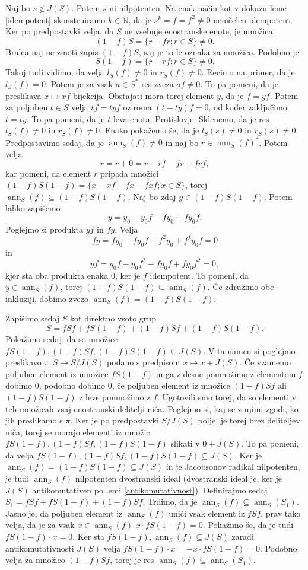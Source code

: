 \documentclass[a4paper, 12pt]{amsart}
\theoremstyle{definition} %
\theoremstyle{plain} %
\newcommand{\N}{\mathbb N}
\DeclareMathOperator{\ann}{ann}
\begin{document}
Naj bo $s\notin J(S)$. Potem $s$ ni nilpotenten. Na enak način kot v dokazu leme \ref{idempotent} skonstruiramo $k\in \N$, da je $s^k = f = f^2\neq 0$ neničelen idempotent. Ker po predpostavki velja, da $S$ ne vsebuje enostranske enote, je množica
$$
(1-f)S = \{r-fr; r\in S\}\neq 0.
$$
Bralca naj ne zmoti zapis $(1-f)S$, saj je to le oznaka za množico. Podobno je 
$$
S(1-f) = \{r-rf;r\in S\} \neq 0.
$$
Takoj tudi vidimo, da velja $l_S(f) \neq 0$ in $r_S(f) \neq 0$. Recimo na primer, da je $l_S(f)=0$. Potem je za vsak $a\in S^*$ res zveza $af \neq 0$. To pa pomeni, da je preslikava $x\mapsto xf$ bijekcija. Obstajati mora torej element $y$, da je $f=yf$. Potem za poljuben $t\in S$ velja $tf = tyf$ oziroma $(t-ty)f=0 $, od koder zaključimo $t = ty$. To pa pomeni, da je $t$ leva enota. Protislovje. Sklenemo, da je res $l_S(f) \neq 0$ in $r_S(f) \neq 0$. Enako pokažemo še, da je $l_S(s) \neq 0$ in $r_S(s) \neq 0$. Predpostavimo sedaj, da je $\ann_S(f) \neq 0$ in naj bo $r\in \ann_S(f)^*$. Potem velja
$$
r = r + 0 = r - rf - fr + frf, 
$$
kar pomeni, da element $r$ pripada množici $(1-f)S(1-f) = \{x-xf-fx+fxf; x\in S\}$, torej $\ann_S(f) \subseteq (1-f)S(1-f)$. Naj bo zdaj $y\in (1-f)S(1-f)$. Potem lahko zapišemo 
$$
y = y_0 - y_0 f -f y_0 + fy_0 f.
$$
Poglejmo si produkta $yf$ in $fy$. Velja 
$$
fy = fy_0 - fy_0 f - f^2 y_0 + f^f y_0 f = 0
$$
in
$$
yf = y_0 f - y_0 f^2 - fy_0 f + fy_0 f^2=0,
$$
kjer sta oba produkta enaka 0, ker je $f$ idempotent. To pomeni, da $y\in \ann_S(f)$, torej $(1-f)S(1-f) \subseteq \ann_S(f)$. Če združimo obe inkluziji, dobimo zvezo $\ann_S(f) = (1-f)S(1-f)$.

Zapišimo sedaj $S$ kot direktno vsoto grup
$$
S = fSf + fS(1-f) + (1-f)Sf + (1-f)S(1-f).
$$
Pokažimo sedaj, da so množice  $fS(1-f), (1-f)Sf, (1-f)S(1-f) \subseteq J(S)$. V ta namen si poglejmo preslikavo $\pi : S \rightarrow S/J(S)$ podano s predpisom $x\mapsto x+J(S)$. Če vzamemo poljuben element iz množice $fS(1-f)$ in ga z desne pomnožimo z elementom $f$ dobimo 0, podobno dobimo 0, če poljuben element iz množice $(1-f)Sf$ ali $(1-f)S(1-f)$ z leve pomnožimo z $f$. Ugotovili smo torej, da so elementi v teh množicah vsaj enostranski delitelji niča. Poglejmo si, kaj se z njimi zgodi, ko jih preslikamo s $\pi$. Ker je po predpostavki $S/J(S)$ polje, je torej brez deliteljev niča, torej se morajo elementi iz množic $fS(1-f), (1-f)Sf, (1-f)S(1-f)$ slikati v $0+J(S)$. To pa pomeni, da velja $fS(1-f), (1-f)Sf, (1-f)S(1-f) \subseteq J(S)$. Ker je $\ann_S(f) = (1-f)S(1-f) \subseteq J(S)$ in je Jacobsonov radikal nilpotenten, je tudi $\ann_S(f)$ nilpotenten dvostranski ideal (dvostranski ideal je, ker je $J(S)$ antikomutativen po lemi \ref{antikomutativnost}). Definirajmo sedaj $S_1 = fSf + fS(1-f) + (1-f)Sf$. Trdimo, da je $\ann_S(f) \subseteq \ann_S(S_1)$. Jasno je, da poljuben element iz $\ann_S(f)$ uniči vsak element iz $fSf$, prav tako velja, da je za vsak $x\in \ann_S(f)$ $x\cdot fS(1-f) = 0$. Pokažimo še, da je tudi $fS(1-f) \cdot x = 0$. Ker sta $fS(1-f), \ann_S(f)\subseteq J(S)$ zaradi antikomutativnosti $J(S)$ velja $fS(1-f) \cdot x = - x\cdot fS(1-f) = 0$. Podobno velja za množico $(1-f)Sf$, torej je res $\ann_S(f) \subseteq \ann_S(S_1)$. 
\end{document}
